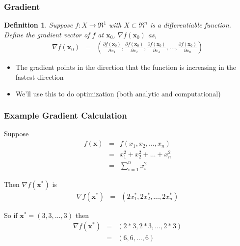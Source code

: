 \documentclass{beamer}
\newtheorem{defn}{Definition}
\numberwithin{equation}{section}
\begin{document}
\begin{frame}
\frametitle{Gradient} 

\begin{defn} 
Suppose $f:X \rightarrow \Re^{1}$ with $X \subset \Re^{n}$ is a differentiable function.  Define the gradient vector of $f$ at $\boldsymbol{x}_{0}$, $\nabla f(\boldsymbol{x}_{0})$ as, 
\begin{eqnarray}
\nabla f (\boldsymbol{x}_{0})  & = & \left(\frac{\partial f (\boldsymbol{x}_{0}) }{\partial x_{1} }, \frac{\partial f (\boldsymbol{x}_{0}) }{\partial x_{2} }, \frac{\partial f (\boldsymbol{x}_{0}) }{\partial x_{3} }, \hdots, \frac{\partial f (\boldsymbol{x}_{0}) }{\partial x_{n} } \right) \nonumber 
\end{eqnarray}

\end{defn}

\begin{itemize}
\item[-] The gradient points in the direction that the function is increasing in the fastest direction
\item[-] We'll use this to do optimization (both analytic and computational)
\end{itemize}



\end{frame}


\begin{frame}
\frametitle{Example Gradient Calculation}

Suppose 
\begin{eqnarray}
f(\boldsymbol{x} ) & = &  f(x_{1}, x_{2}, \hdots, x_{n}) \nonumber \\
							& = & x_{1}^2 + x_{2}^2 + \hdots + x_{n}^2 \nonumber \\ 
							&= & \sum_{i=1}^{n} x_{i}^{2} \nonumber 
\end{eqnarray}							

Then $\nabla f(\boldsymbol{x}^{*})$ is 
\begin{eqnarray}
\nabla f(\boldsymbol{x}^{*}) & = & \left( 2 x_{1}^{*}, 2 x_{2}^{*}, \hdots, 2 x_{n}^{*} \right) \nonumber 
\end{eqnarray}

So if $\boldsymbol{x}^{*} = (3, 3, \hdots, 3)$ then 
\begin{eqnarray}
\nabla f(\boldsymbol{x}^{*}) & = & (2*3, 2*3, \hdots, 2 *3) \nonumber \\
										& = & (6, 6, \hdots, 6) \nonumber 
\end{eqnarray}





\end{frame}
\end{document}
